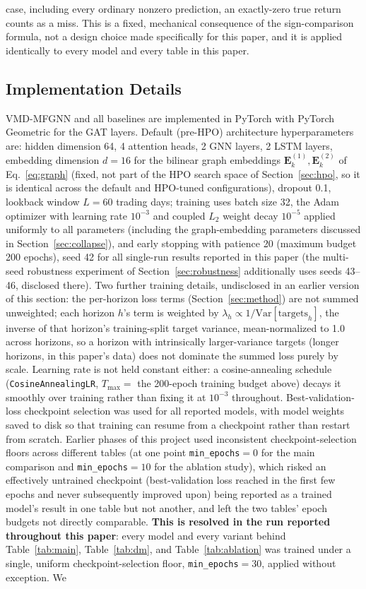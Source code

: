 \documentclass[journal]{IEEEtran}
\begin{document}
case, including every ordinary nonzero prediction, an exactly-zero true return counts as a miss. This is a fixed, mechanical consequence of the sign-comparison formula, not a design choice made specifically for this paper, and it is applied identically to every model and every table in this paper.

\subsection{Implementation Details}
\label{sec:impl}

VMD-MFGNN and all baselines are implemented in PyTorch with PyTorch Geometric for the GAT layers. Default (pre-HPO) architecture hyperparameters are: hidden dimension 64, 4 attention heads, 2 GNN layers, 2 LSTM layers, embedding dimension $d=16$ for the bilinear graph embeddings $\mathbf{E}^{(1)}_k,\mathbf{E}^{(2)}_k$ of Eq.~\ref{eq:graph} (fixed, not part of the HPO search space of Section~\ref{sec:hpo}, so it is identical across the default and HPO-tuned configurations), dropout 0.1, lookback window $L=60$ trading days; training uses batch size 32, the Adam optimizer with learning rate $10^{-3}$ and coupled $L_2$ weight decay $10^{-5}$ applied uniformly to all parameters (including the graph-embedding parameters discussed in Section~\ref{sec:collapse}), and early stopping with patience 20 (maximum budget 200 epochs), seed 42 for all single-run results reported in this paper (the multi-seed robustness experiment of Section~\ref{sec:robustness} additionally uses seeds 43--46, disclosed there). Two further training details, undisclosed in an earlier version of this section: the per-horizon loss terms (Section~\ref{sec:method}) are not summed unweighted; each horizon $h$'s term is weighted by $\lambda_h \propto 1/\mathrm{Var}[\text{targets}_h]$, the inverse of that horizon's training-split target variance, mean-normalized to 1.0 across horizons, so a horizon with intrinsically larger-variance targets (longer horizons, in this paper's data) does not dominate the summed loss purely by scale. Learning rate is not held constant either: a cosine-annealing schedule (\texttt{CosineAnnealingLR}, $T_{\max}=$ the 200-epoch training budget above) decays it smoothly over training rather than fixing it at $10^{-3}$ throughout. Best-validation-loss checkpoint selection was used for all reported models, with model weights saved to disk so that training can resume from a checkpoint rather than restart from scratch. Earlier phases of this project used inconsistent checkpoint-selection floors across different tables (at one point \texttt{min\_epochs}$=0$ for the main comparison and \texttt{min\_epochs}$=10$ for the ablation study), which risked an effectively untrained checkpoint (best-validation loss reached in the first few epochs and never subsequently improved upon) being reported as a trained model's result in one table but not another, and left the two tables' epoch budgets not directly comparable. \textbf{This is resolved in the run reported throughout this paper}: every model and every variant behind Table~\ref{tab:main}, Table~\ref{tab:dm}, and Table~\ref{tab:ablation} was trained under a single, uniform checkpoint-selection floor, \texttt{min\_epochs}$=30$, applied without exception. We 
\end{document}
